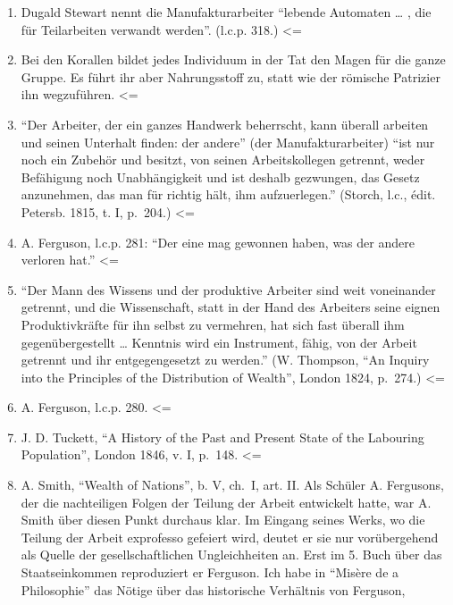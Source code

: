 {\begin{enumerate}
  der Politik die Zentralisation der öffentlichen Gewalten und die
  Teilung der Privatinteressen.'' (Karl Marx, l.c.p. 134
  \textless{}Siehe Band, S.153\textgreater{}.) \textless{}=
\item
  Dugald Stewart nennt die Manufakturarbeiter ``lebende Automaten
  \ldots{} , die für Teilarbeiten verwandt werden''. (l.c.p. 318.)
  \textless{}=
\item
  Bei den Korallen bildet jedes Individuum in der Tat den Magen für die
  ganze Gruppe. Es führt ihr aber Nahrungsstoff zu, statt wie der
  römische Patrizier ihn wegzuführen. \textless{}=
\item
  ``Der Arbeiter, der ein ganzes Handwerk beherrscht, kann überall
  arbeiten und seinen Unterhalt finden: der andere'' (der
  Manufakturarbeiter) ``ist nur noch ein Zubehör und besitzt, von seinen
  Arbeitskollegen getrennt, weder Befähigung noch Unabhängigkeit und ist
  deshalb gezwungen, das Gesetz anzunehmen, das man für richtig hält,
  ihm aufzuerlegen.'' (Storch, l.c., édit. Petersb. 1815, t. I, p.~204.)
  \textless{}=
\item
  A. Ferguson, l.c.p. 281: ``Der eine mag gewonnen haben, was der andere
  verloren hat.'' \textless{}=
\item
  ``Der Mann des Wissens und der produktive Arbeiter sind weit
  voneinander getrennt, und die Wissenschaft, statt in der Hand des
  Arbeiters seine eignen Produktivkräfte für ihn selbst zu vermehren,
  hat sich fast überall ihm gegenübergestellt \ldots{} Kenntnis wird ein
  Instrument, fähig, von der Arbeit getrennt und ihr entgegengesetzt zu
  werden.'' (W. Thompson, ``An Inquiry into the Principles of the
  Distribution of Wealth'', London 1824, p.~274.) \textless{}=
\item
  A. Ferguson, l.c.p. 280. \textless{}=
\item
  J. D. Tuckett, ``A History of the Past and Present State of the
  Labouring Population'', London 1846, v. I, p.~148. \textless{}=
\item
  A. Smith, ``Wealth of Nations'', b. V, ch.~I, art. II. Als Schüler A.
  Fergusons, der die nachteiligen Folgen der Teilung der Arbeit
  entwickelt hatte, war A. Smith über diesen Punkt durchaus klar. Im
  Eingang seines Werks, wo die Teilung der Arbeit exprofesso gefeiert
  wird, deutet er sie nur vorübergehend als Quelle der
  gesellschaftlichen Ungleichheiten an. Erst im 5. Buch über das
  Staatseinkommen reproduziert er Ferguson. Ich habe in ``Misère de a
  Philosophie'' das Nötige über das historische Verhältnis von Ferguson,

\end{enumerate}}

